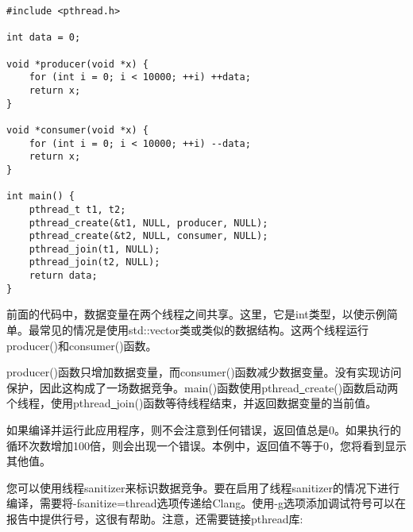 \begin{lstlisting}[caption={}]
#include <pthread.h>

int data = 0;

void *producer(void *x) {
	for (int i = 0; i < 10000; ++i) ++data;
	return x;
}

void *consumer(void *x) {
	for (int i = 0; i < 10000; ++i) --data;
	return x;
}

int main() {
	pthread_t t1, t2;
	pthread_create(&t1, NULL, producer, NULL);
	pthread_create(&t2, NULL, consumer, NULL);
	pthread_join(t1, NULL);
	pthread_join(t2, NULL);
	return data;
}
\end{lstlisting}

前面的代码中，数据变量在两个线程之间共享。这里，它是int类型，以使示例简单。最常见的情况是使用std::vector类或类似的数据结构。这两个线程运行producer()和consumer()函数。\par

producer()函数只增加数据变量，而consumer()函数减少数据变量。没有实现访问保护，因此这构成了一场数据竞争。main()函数使用pthread\underline{~}create()函数启动两个线程，使用pthread\underline{~}join()函数等待线程结束，并返回数据变量的当前值。\par

如果编译并运行此应用程序，则不会注意到任何错误，返回值总是0。如果执行的循环次数增加100倍，则会出现一个错误。本例中，返回值不等于0，您将看到显示其他值。\par

您可以使用线程sanitizer来标识数据竞争。要在启用了线程sanitizer的情况下进行编译，需要将-fsanitize=thread选项传递给Clang。使用-g选项添加调试符号可以在报告中提供行号，这很有帮助。注意，还需要链接pthread库:\par

